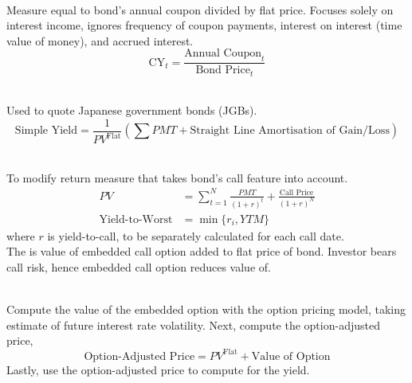 \begin{definition} \\
Measure equal to bond's annual coupon divided by flat price. Focuses solely on interest income, ignores frequency of coupon payments, interest on interest (time value of money), and accrued interest.
\begin{equation}
\text{CY}_t = \frac{\text{Annual Coupon}_t}{\text{Bond Price}_t} \nonumber
\end{equation}
\end{definition}

\begin{definition} \\
Used to quote Japanese government bonds (JGBs).
\begin{equation}
\text{Simple Yield} = \frac{1}{PV^{\text{Flat}}} \left(\sum PMT + \text{Straight Line Amortisation of Gain/Loss} \right) \nonumber
\end{equation}
\end{definition}

\begin{definition} \\
To modify return measure that takes bond's call feature into account.
\begin{align}
PV &= \sum\limits_{t=1}^N \frac{PMT}{(1+r)^t} + \frac{\text{Call Price}}{(1+r)^N} \nonumber \\
\text{Yield-to-Worst} &= \min\{r_i, YTM\} \nonumber
\end{align}
where $r$ is yield-to-call, to be separately calculated for each call date.\\
The  is value of embedded call option added to flat price of bond. Investor bears call risk, hence embedded call option reduces value of.
\end{definition}

\begin{definition} \\
Compute the value of the embedded option with the option pricing model, taking estimate of future interest rate volatility. Next, compute the option-adjusted price,
\begin{equation}
\text{Option-Adjusted Price} = PV^{\text{Flat}} + \text{Value of Option} \nonumber
\end{equation}
Lastly, use the option-adjusted price to compute for the yield.
\end{definition}

